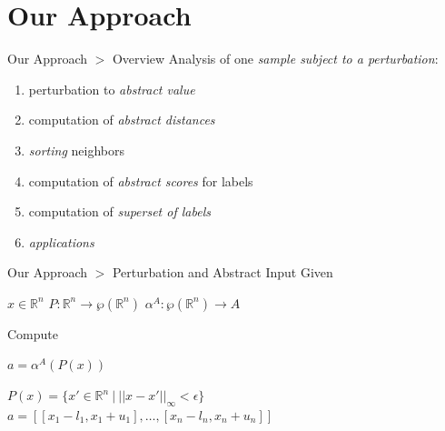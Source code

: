 \documentclass[11pt]{beamer}
\begin{document}
\section{Our Approach}
\begin{frame}{Our Approach $>$ Overview}
Analysis of one \emph{sample subject to a perturbation}:
\begin{enumerate}
 \item perturbation to \emph{abstract value}
 \item computation of \emph{abstract distances}
 \item \emph{sorting} neighbors
 \item computation of \emph{abstract scores} for labels
 \item computation of \emph{superset of labels}
 \item \emph{applications}
\end{enumerate}
\end{frame}

\begin{frame}{Our Approach $>$ Perturbation and Abstract Input}
Given
\begin{center}
 $x \in \mathbb{R}^n$
 \hspace{2em}
 $P: \mathbb{R}^n \rightarrow \wp(\mathbb{R}^n)$
 \hspace{2em} 
 $\alpha^A: \wp(\mathbb{R}^n) \rightarrow A$
\end{center}

Compute
\begin{center}
 $a = \alpha^A(P(x))$
 
 
 
 
\end{center}
 
\begin{center}
 $P(x) = \{x' \in \mathbb{R}^n ~|~ ||x - x'||_\infty < \epsilon\}$	
 $a = [[x_1 - l_1, x_1 + u_1], \ldots, [x_n - l_n, x_n + u_n]]$	
\end{center}
\end{frame}
\end{document}
